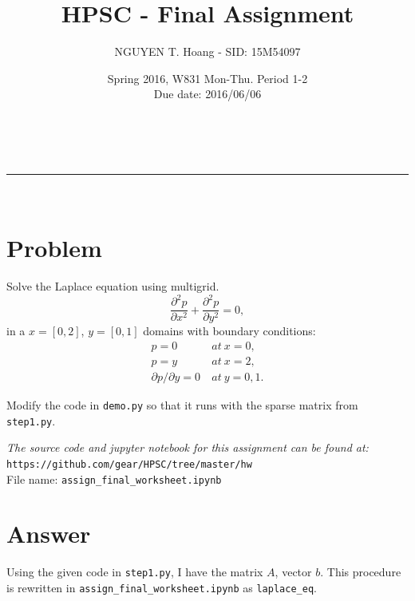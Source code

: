 \documentclass[a4paper,12pt]{article}
\makeatletter
\newcommand{\linia}{\rule{\linewidth}{0.5pt}}
\renewcommand{\maketitle} {%
\begin{center}
\vspace{2ex}
{\huge \textsc{\@title}}
\vspace{1ex}
\\
\linia\\
\@author \hfill \@date
\vspace{4ex}
\end{center}
}
\makeatother
\begin{document}

\title{HPSC - Final Assignment}

\author{NGUYEN T. Hoang - SID: 15M54097}

\date{Spring 2016, W831 Mon-Thu. Period 1-2 \\ \hfill Due date: 2016/06/06}

\maketitle

\vspace{8em}
\section*{Problem}
\noindent
Solve the Laplace equation using multigrid.
$$\frac{\partial^2p}{\partial x^2} + \frac{\partial^2p}{\partial y^2} = 0,$$
in a $x=[0,2]$, $y=[0,1]$ domains with boundary conditions:
\begin{equation*}
    \begin{aligned}
        p=0 \ & at\ x=0,\\
        p=y \ & at\ x=2,\\
        \partial p / \partial y = 0 \ & at\ y=0,1.
    \end{aligned}
\end{equation*}

Modify the code in \texttt{demo.py} so that it runs with the sparse matrix from \texttt{step1.py}.

\vspace{10em}
\noindent
\emph{The source code and jupyter notebook for this assignment can be found at:} \\
\texttt{https://github.com/gear/HPSC/tree/master/hw} \\
\noindent
File name: \texttt{assign\_final\_worksheet.ipynb}
\pagebreak
\section*{Answer}

\noindent
Using the given code in \texttt{step1.py}, I have the matrix $A$, vector $b$. This procedure is rewritten in \texttt{assign\_final\_worksheet.ipynb} as \texttt{laplace\_eq}.
\end{document}
